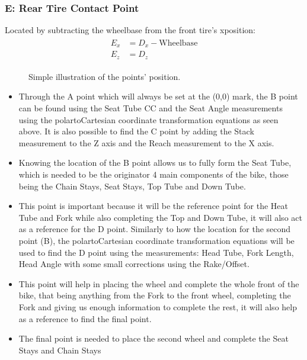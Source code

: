 \documentclass[letterpaper,10pt,english]{jupyterBook}
\begin{document}
\subsubsection{E: Rear Tire Contact Point}
\label{\detokenize{Setting the Rig:e-rear-tire-contact-point}}
\sphinxAtStartPar
Located by subtracting the wheelbase from the front tire’s x\sphinxhyphen{}position:
\begin{equation*}
\begin{split}
\begin{aligned}
E_x &= D_x - \text{Wheelbase} \\
E_z &= D_z
\end{aligned}
\end{split}
\end{equation*}
\begin{figure}[htbp]
\centering
\capstart

\noindent{}
\caption{Simple illustration of the points’ position.}\label{\detokenize{Setting the Rig:points}}\end{figure}
\begin{itemize}
\item {} 
\sphinxAtStartPar
{} Through the A point which will always be set at the (0,0) mark, the B point can be found using the Seat Tube C\sphinxhyphen{}C and the Seat Angle measurements using the polar\sphinxhyphen{}to\sphinxhyphen{}Cartesian coordinate transformation equations as seen above. It is also possible to find the C point by adding the Stack measurement to the Z axis and the Reach measurement to the X axis.

\item {} 
\sphinxAtStartPar
{} Knowing the location of the B point allows us to fully form the Seat Tube, which is needed to be the originator 4 main components of the bike, those being the Chain Stays, Seat Stays, Top Tube and Down Tube.

\item {} 
\sphinxAtStartPar
{} This point is important because it will be the reference point for the Heat Tube and Fork while also completing the Top and Down Tube, it will also act as a reference for the D point. Similarly to how the location for the second point (B), the polar\sphinxhyphen{}to\sphinxhyphen{}Cartesian coordinate transformation equations will be used to find the D point using the measurements: Head Tube, Fork Length, Head Angle with some small corrections using the Rake/Offset.

\item {} 
\sphinxAtStartPar
{} This point will help in placing the wheel and complete the whole front of the bike, that being anything from the Fork to the front wheel, completing the Fork and giving us enough information to complete the rest, it will also help as a reference to find the final point.

\item {} 
\sphinxAtStartPar
{} The final point is needed to place the second wheel and complete the Seat Stays and Chain Stays

\end{itemize}
\end{document}

